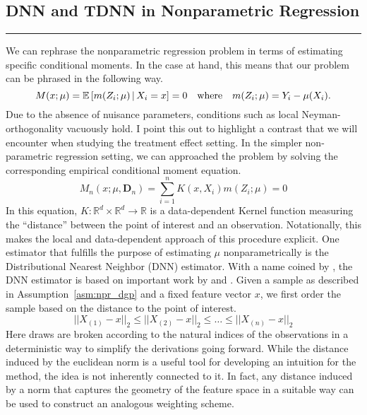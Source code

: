 \subsection{DNN and TDNN in Nonparametric Regression}
\hrule
We can rephrase the nonparametric regression problem in terms of estimating specific conditional moments.
In the case at hand, this means that our problem can be phrased in the following way.
\begin{equation}\label{CondMomEq}
	M(x; \mu)
	= \mathbb{E}\left[m(Z_{i}; \mu) \, | \, X_{i} = x\right]
	= 0
	\quad \text{where} \quad
	m(Z_{i}; \mu) = Y_{i} - \mu(X_{i}).
\end{equation}
Due to the absence of nuisance parameters, conditions such as local Neyman-orthogonality vacuously hold.
I point this out to highlight a contrast that we will encounter when studying the treatment effect setting.
In the simpler non-parametric regression setting, we can approached the problem by solving the corresponding empirical conditional moment equation.
\begin{equation}\label{EmpCondMomEq}
	M_n(x; \mu, \mathbf{D}_n)
	= \sum_{i = 1}^{n}K(x, X_{i})m(Z_{i}; \mu)
	= 0
\end{equation}
In this equation, $K:\mathbb{R}^d \times \mathbb{R}^d \rightarrow \mathbb{R}$ is a data-dependent Kernel function measuring the ``distance'' between the point of interest and an observation.
Notationally, this makes the local and data-dependent approach of this procedure explicit.
One estimator that fulfills the purpose of estimating $\mu$ nonparametrically is the Distributional Nearest Neighbor (DNN) estimator.
With a name coined by \citet{demirkaya_optimal_2024}, the DNN estimator is based on important work by \citet{steele_exact_2009} and \citet{biau_rate_2010}.
Given a sample as described in Assumption~\ref{asm:npr_dgp} and a fixed feature vector $x$, we first order the sample based on the distance to the point of interest.
\begin{equation}\label{eq:ordering}
	||X_{(1)} - x||_2
	\leq ||X_{(2)} - x||_2
	\leq \dotsc
	\leq ||X_{(n)} - x||_2
\end{equation}
Here draws are broken according to the natural indices of the observations in a deterministic way to simplify the derivations going forward.
While the distance induced by the euclidean norm is a useful tool for developing an intuition for the method, the idea is not inherently connected to it.
In fact, any distance induced by a norm that captures the geometry of the feature space in a suitable way can be used to construct an analogous weighting scheme.
